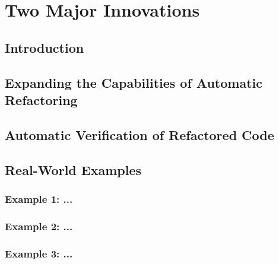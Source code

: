 \chapter[Chapter 2]{Two Major Innovations}
\label{chap:proposed_approach}

\section{Introduction}
\label{sec:tmi_introduction}

\section{Expanding the Capabilities of Automatic Refactoring}
\label{sec:expanding_capabilities}

\section{Automatic Verification of Refactored Code}
\label{sec:automatic_verification}

\section{Real-World Examples}
\label{sec:real_world_examples}

\subsection{Example 1: ...}
\label{subsec:example_1}

\subsection{Example 2: ...}
\label{subsec:example_2}

\subsection{Example 3: ...}
\label{subsec:example_3}

\renewcommand\thefigure{\thechapter .\arabic{figure}}
